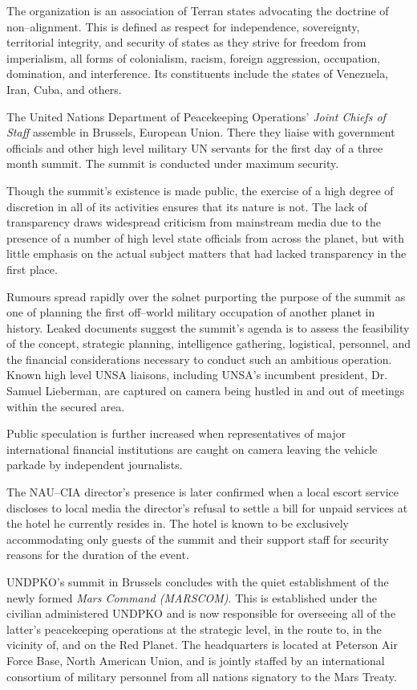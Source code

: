 The organization is an association of Terran states advocating the doctrine of non--alignment. This is defined as respect for independence, sovereignty, territorial integrity, and security of states as they strive for freedom from imperialism, all forms of colonialism, racism, foreign aggression, occupation, domination, and interference. Its constituents include the states of Venezuela, Iran, Cuba, and others.
\StopTimelineDate

The United Nations Department of Peacekeeping Operations' {\it Joint Chiefs of Staff} assemble in Brussels, European Union. There they liaise with government officials and other high level military UN servants for the first day of a three month summit. The summit is conducted under maximum security. 

Though the summit's existence is made public, the exercise of a high degree of discretion in all of its activities ensures that its nature is not. The lack of transparency draws widespread criticism from mainstream media due to the presence of a number of high level state officials from across the planet, but with little emphasis on the actual subject matters that had lacked transparency in the first place.

Rumours spread rapidly over the solnet purporting the purpose of the summit as one of planning the first off--world military occupation of another planet in history. Leaked documents suggest the summit's agenda is to assess the feasibility of the concept, strategic planning, intelligence gathering, logistical, personnel, and the financial considerations necessary to conduct such an ambitious operation. Known high level UNSA liaisons, including UNSA's incumbent president, Dr. Samuel Lieberman, are captured on camera being hustled in and out of meetings within the secured area.

Public speculation is further increased when representatives of major international financial institutions are caught on camera leaving the vehicle parkade by independent journalists. 

The NAU--CIA director's presence is later confirmed when a local escort service discloses to local media the director's refusal to settle a bill for unpaid services at the hotel he currently resides in. The hotel is known to be exclusively accommodating only guests of the summit and their support staff for security reasons for the duration of the event.
\StopTimelineDate

UNDPKO's summit in Brussels concludes with the quiet establishment of the newly formed {\it Mars Command (MARSCOM)}. This is established under the civilian administered UNDPKO and is now responsible for overseeing all of the latter's peacekeeping operations at the strategic level, in the route to, in the vicinity of, and on the Red Planet. The headquarters is located at Peterson Air Force Base, North American Union, and is jointly staffed by an international consortium of military personnel from all nations signatory to the Mars Treaty.

